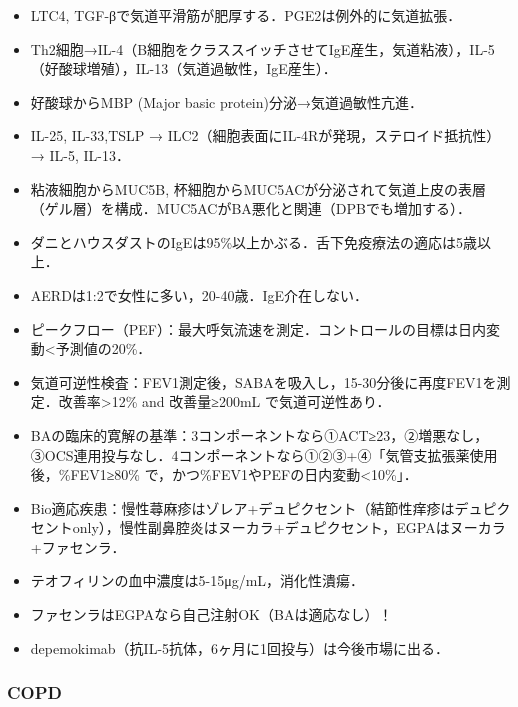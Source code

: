 \begin{itemize}
\item LTC4, TGF-βで気道平滑筋が肥厚する．PGE2は例外的に気道拡張．
\item Th2細胞→IL-4（B細胞をクラススイッチさせてIgE産生，気道粘液），IL-5（好酸球増殖），IL-13（気道過敏性，IgE産生）． 
\item 好酸球からMBP (Major basic protein)分泌→気道過敏性亢進．
\item IL-25, IL-33,TSLP → ILC2（細胞表面にIL-4Rが発現，ステロイド抵抗性） → IL-5, IL-13．
\item 粘液細胞からMUC5B, 杯細胞からMUC5ACが分泌されて気道上皮の表層（ゲル層）を構成．MUC5ACがBA悪化と関連（DPBでも増加する）．
\item ダニとハウスダストのIgEは95\%以上かぶる．舌下免疫療法の適応は5歳以上．
\item AERDは1:2で女性に多い，20-40歳．IgE介在しない．
\item ピークフロー（PEF）：最大呼気流速を測定．コントロールの目標は日内変動<予測値の20\%．
\item 気道可逆性検査：FEV1測定後，SABAを吸入し，15-30分後に再度FEV1を測定．改善率>12\% and 改善量≥200mL で気道可逆性あり．
\item BAの臨床的寛解の基準：3コンポーネントなら①ACT≥23，②増悪なし，③OCS連用投与なし．4コンポーネントなら①②③+④「気管支拡張薬使用後，\%FEV1≥80\% で，かつ\%FEV1やPEFの日内変動<10\%」．
\item Bio適応疾患：慢性蕁麻疹はゾレア+デュピクセント（結節性痒疹はデュピクセントonly），慢性副鼻腔炎はヌーカラ+デュピクセント，EGPAはヌーカラ+ファセンラ．
\item テオフィリンの血中濃度は5-15μg/mL，消化性潰瘍．
\item ファセンラはEGPAなら自己注射OK（BAは適応なし）！
\item depemokimab（抗IL-5抗体，6ヶ月に1回投与）は今後市場に出る．

\end{itemize}

\subsubsection{COPD}

